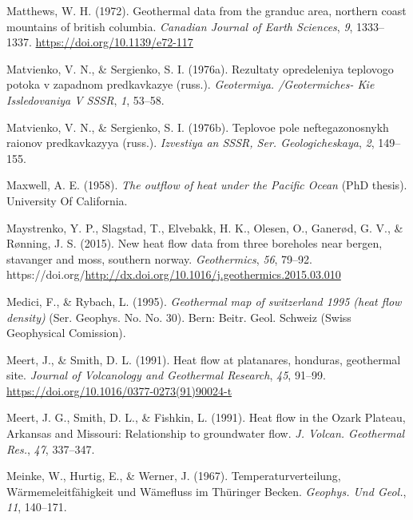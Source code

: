 \documentclass[draft,linenumbers]{agujournal2018}
\begin{document}
\leavevmode{}%
Matthews, W. H. (1972). Geothermal data from the granduc area, northern
coast mountains of british columbia. \emph{Canadian Journal of Earth
Sciences}, \emph{9}, 1333--1337. \url{https://doi.org/10.1139/e72-117}

\leavevmode{}%
Matvienko, V. N., \& Sergienko, S. I. (1976a). Rezultaty opredeleniya
teplovogo potoka v zapadnom predkavkazye (russ.). \emph{Geotermiya.
/Geotermiches- Kie Issledovaniya V SSSR}, \emph{1}, 53--58.

\leavevmode{}%
Matvienko, V. N., \& Sergienko, S. I. (1976b). Teplovoe pole
neftegazonosnykh raionov predkavkazyya (russ.). \emph{Izvestiya an SSSR,
Ser. Geologicheskaya}, \emph{2}, 149--155.

\leavevmode{}%
Maxwell, A. E. (1958). \emph{The outflow of heat under the {Pacific
Ocean}} (PhD thesis). University Of California.

\leavevmode{}%
Maystrenko, Y. P., Slagstad, T., Elvebakk, H. K., Olesen, O., Ganerød,
G. V., \& Rønning, J. S. (2015). New heat flow data from three boreholes
near bergen, stavanger and moss, southern norway. \emph{Geothermics},
\emph{56}, 79--92.
https://doi.org/\url{http://dx.doi.org/10.1016/j.geothermics.2015.03.010}

\leavevmode{}%
Medici, F., \& Rybach, L. (1995). \emph{Geothermal map of switzerland
1995 (heat flow density)} (Ser. Geophys. No. No. 30). Bern: Beitr. Geol.
Schweiz (Swiss Geophysical Comission).

\leavevmode{}%
Meert, J., \& Smith, D. L. (1991). Heat flow at platanares, honduras,
geothermal site. \emph{Journal of Volcanology and Geothermal Research},
\emph{45}, 91--99. \url{https://doi.org/10.1016/0377-0273(91)90024-t}

\leavevmode{}%
Meert, J. G., Smith, D. L., \& Fishkin, L. (1991). Heat flow in the
{Ozark Plateau, Arkansas and Missouri}: Relationship to groundwater
flow. \emph{J. Volcan. Geothermal Res.}, \emph{47}, 337--347.

\leavevmode{}%
Meinke, W., Hurtig, E., \& Werner, J. (1967). Temperaturverteilung,
{W{ä}rmemeleitf{ä}higkeit und W{ä}mefluss im Th{ü}ringer Becken}.
\emph{Geophys. Und Geol.}, \emph{11}, 140--171.
\end{document}

